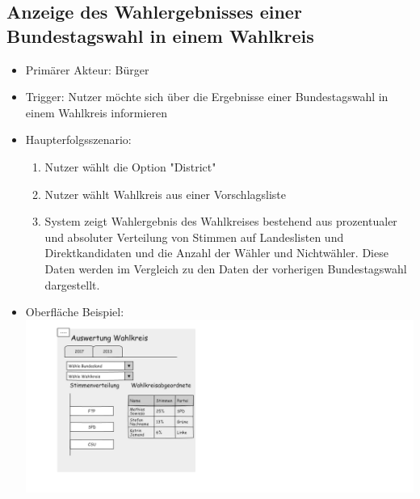 \documentclass[a4paper]{scrreprt}
\begin{document}
\subsection{Anzeige des Wahlergebnisses einer Bundestagswahl in einem Wahlkreis}
\begin{itemize}
\item Primärer Akteur: Bürger
\item Trigger: Nutzer möchte sich über die Ergebnisse einer Bundestagswahl in einem Wahlkreis informieren
\item Haupterfolgsszenario:
\begin{enumerate}
\item Nutzer wählt die Option "District"
\item Nutzer wählt Wahlkreis aus einer Vorschlagsliste
\item System zeigt Wahlergebnis des Wahlkreises bestehend aus prozentualer und absoluter Verteilung von Stimmen auf Landeslisten und Direktkandidaten und die Anzahl der Wähler und Nichtwähler. Diese Daten werden im Vergleich zu den Daten der vorherigen Bundestagswahl dargestellt.
\end{enumerate}
\item Oberfläche Beispiel: \\
\includegraphics[width=.9\textwidth]{images/wahlkreis.png}
\end{itemize}
\end{document}
